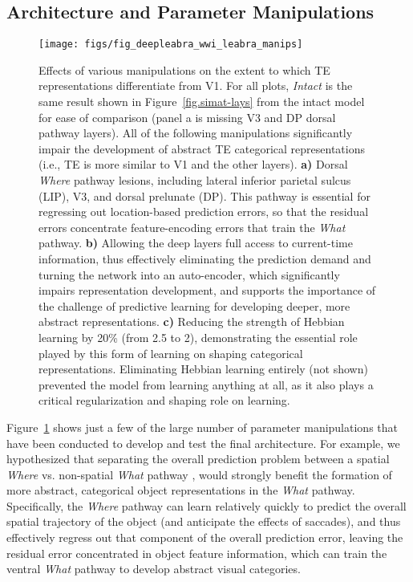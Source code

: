 \documentclass[11pt,twoside]{article}
\newif\myifpdf
\begin{document}
\subsection{Architecture and Parameter Manipulations}

\begin{figure}
  \centering\texttt{[image: figs/fig\_deepleabra\_wwi\_leabra\_manips]}
  \caption{\footnotesize Effects of various manipulations on the extent to which TE representations differentiate from V1.  For all plots, \emph{Intact} is the same result shown in Figure~\ref{fig.simat-lays} from the intact model for ease of comparison (panel a is missing V3 and DP dorsal pathway layers).  All of the following  manipulations significantly impair the development of abstract TE categorical representations (i.e., TE is more similar to V1 and the other layers).  {\bf a)} Dorsal \emph{Where} pathway lesions, including lateral inferior parietal sulcus (LIP), V3, and dorsal prelunate (DP).  This pathway is essential for regressing out location-based prediction errors, so that the residual errors concentrate feature-encoding errors that train the \emph{What} pathway.  {\bf b)} Allowing the deep layers full access to current-time information, thus effectively eliminating the prediction demand and turning the network into an auto-encoder, which significantly impairs representation development, and supports the importance of the challenge of predictive learning for developing deeper, more abstract representations.  {\bf c)} Reducing the strength of Hebbian learning by 20\% (from 2.5 to 2), demonstrating the essential role played by this form of learning on shaping categorical representations.  Eliminating Hebbian learning entirely (not shown) prevented the model from learning anything at all, as it also plays a critical regularization and shaping role on learning.}
  \label{fig.manips}
\end{figure}

Figure~\ref{fig.manips} shows just a few of the large number of parameter manipulations that have been conducted to develop and test the final architecture.  For example, we hypothesized that separating the overall prediction problem between a spatial \emph{Where} vs. non-spatial \emph{What} pathway \citep{UngerleiderMishkin82,GoodaleMilner92}, would strongly benefit the formation of more abstract, categorical object representations in the \emph{What} pathway.  Specifically, the \emph{Where} pathway can learn relatively quickly to predict the overall spatial trajectory of the object (and anticipate the effects of saccades), and thus effectively regress out that component of the overall prediction error, leaving the residual error concentrated in object feature information, which can train the ventral \emph{What} pathway to develop abstract visual categories.
\end{document}
